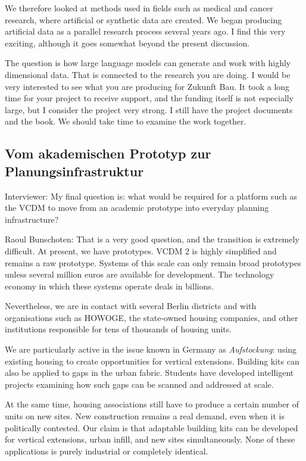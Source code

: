 We therefore looked at methods used in fields such as medical and cancer research, where artificial or synthetic data are created. We began producing artificial data as a parallel research process several years ago. I find this very exciting, although it goes somewhat beyond the present discussion.

The question is how large language models can generate and work with highly dimensional data. That is connected to the research you are doing. I would be very interested to see what you are producing for Zukunft Bau. It took a long time for your project to receive support, and the funding itself is not especially large, but I consider the project very strong. I still have the project documents and the book. We should take time to examine the work together.

\subsection{Vom akademischen Prototyp zur Planungsinfrastruktur}

Interviewer: My final question is: what would be required for a platform such as the VCDM to move from an academic prototype into everyday planning infrastructure?

Raoul Bunschoten: That is a very good question, and the transition is extremely difficult. At present, we have prototypes. VCDM 2 is highly simplified and remains a raw prototype. Systems of this scale can only remain broad prototypes unless several million euros are available for development. The technology economy in which these systems operate deals in billions.

Nevertheless, we are in contact with several Berlin districts and with organisations such as HOWOGE, the state-owned housing companies, and other institutions responsible for tens of thousands of housing units.

We are particularly active in the issue known in Germany as \textit{Aufstockung}: using existing housing to create opportunities for vertical extensions. Building kits can also be applied to gaps in the urban fabric. Students have developed intelligent projects examining how such gaps can be scanned and addressed at scale.

At the same time, housing associations still have to produce a certain number of units on new sites. New construction remains a real demand, even when it is politically contested. Our claim is that adaptable building kits can be developed for vertical extensions, urban infill, and new sites simultaneously. None of these applications is purely industrial or completely identical.

